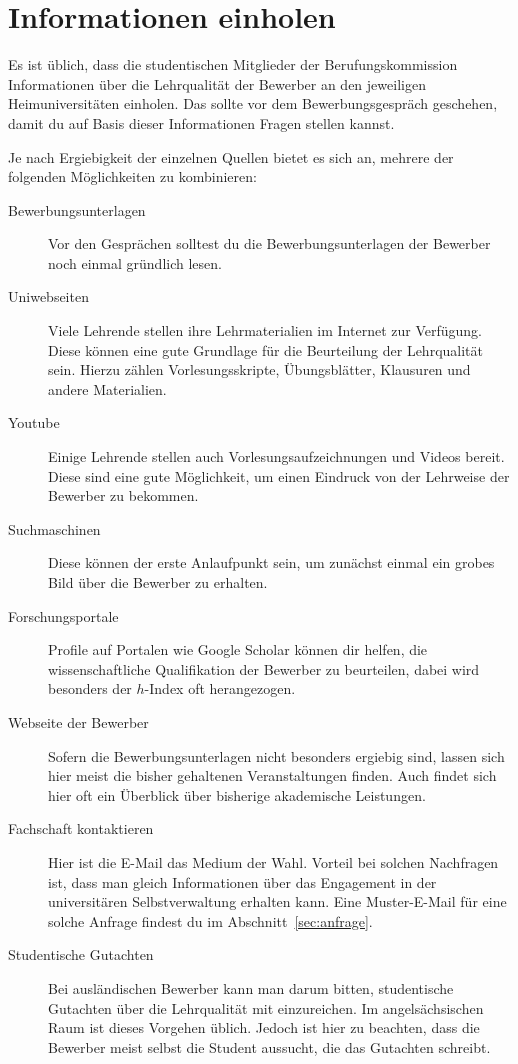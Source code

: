 \section{Informationen einholen}
Es ist üblich, dass die studentischen Mitglieder der Berufungskommission Informationen über die Lehrqualität der Bewerber an den jeweiligen Heimuniversitäten einholen.
Das sollte vor dem Bewerbungsgespräch geschehen, damit du auf Basis dieser Informationen Fragen stellen kannst.

Je nach Ergiebigkeit der einzelnen Quellen bietet es sich an, mehrere der folgenden Möglichkeiten zu kombinieren:
\begin{description}
      \item [Bewerbungsunterlagen]
            Vor den Gesprächen solltest du die Bewerbungsunterlagen der Bewerber noch einmal gründlich lesen.
      \item [Uniwebseiten]
            Viele Lehrende stellen ihre Lehrmaterialien im Internet zur Verfügung. Diese können eine gute Grundlage für die Beurteilung der Lehrqualität sein. Hierzu zählen Vorlesungsskripte, Übungsblätter, Klausuren und andere Materialien.
      \item [Youtube]
            Einige Lehrende stellen auch Vorlesungsaufzeichnungen und Videos bereit. Diese sind eine gute Möglichkeit, um einen Eindruck von der Lehrweise der Bewerber zu bekommen.
      \item [Suchmaschinen]
            Diese können der erste Anlaufpunkt sein, um zunächst einmal ein grobes Bild über die Bewerber zu erhalten.
      \item [Forschungsportale]
            Profile auf Portalen wie Google Scholar können dir helfen, die wissenschaftliche Qualifikation der Bewerber zu beurteilen, dabei wird besonders der $h$-Index oft herangezogen.
      \item [Webseite der Bewerber]
            Sofern die Bewerbungsunterlagen nicht besonders ergiebig sind, lassen sich hier meist die bisher gehaltenen Veranstaltungen finden. Auch findet sich hier oft ein Überblick über bisherige akademische Leistungen.
      \item [Fachschaft kontaktieren]
            Hier ist die E-Mail das Medium der Wahl. Vorteil bei solchen Nachfragen ist, dass man gleich Informationen über das Engagement in der universitären Selbstverwaltung erhalten kann. Eine Muster-E-Mail für eine solche Anfrage findest du im Abschnitt~\ref{sec:anfrage}.
      \item [Studentische Gutachten]
            Bei ausländischen Bewerber kann man darum bitten, studentische Gutachten über die Lehrqualität mit einzureichen. Im angelsächsischen Raum ist dieses Vorgehen üblich. Jedoch ist hier zu beachten, dass die Bewerber meist selbst die Student aussucht, die das Gutachten schreibt.
\end{description}

